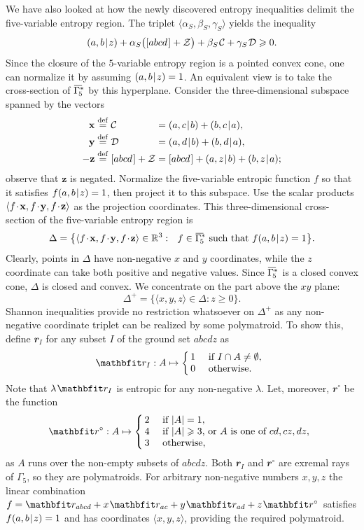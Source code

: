 \documentclass[reqno]{amsart}
\makeatletter
\theoremstyle{definition}
\renewenvironment{cases}{\left\{\mkern-6mu\begin{array}{l@{~~~}l}}{\end{array}\right.}
\newcommand\tsp{\mkern 1.5mu}
\def\|{\mkern1.5mu{|}\mkern1.5mu}
\renewcommand\ge{\geqslant}\renewcommand\le{\leqslant}
\newcommand\C{\mathcal C}
\newcommand\D{\mathcal D}
\newcommand\Z{\mathcal Z} %
\newcommand\R{\mathbb R}  %
\def\<{\langle}\def\>{\rangle}
\def\r{\mathbfit r}
\newcommand\eqdef{\stackrel{\mathrm{def}}{=}}
\def\m#1{\tsp{#1}\tsp}
\def\G#1{\Gamma_{\!#1}}
\def\barGamma{\mkern1mu\overline{\hbox{$\mkern-1mu\Gamma\mkern4mu$}}\mkern-4mu}
\def\clGa#1{\barGamma^*_{\!#1}}
\def\abcd{[abcd\tsp]}
\makeatother
\begin{document}
We have also looked at how the newly discovered entropy inequalities delimit
the five-variable entropy region. The triplet $\<\alpha_S, \beta_S,
\gamma_S\>$ yields the inequality
$$
    (a,b\|z)+ \alpha_S\big( \abcd+\Z \big) + \beta_S\tsp\C +
     \gamma_S\tsp\D \ge 0.
$$
Since the closure of the $5$-variable entropy region is a pointed convex
cone, one can normalize it by assuming $(a,b\|z)=1$. An equivalent view is
to take the cross-section of $\clGa5$ by this hyperplane. Consider the
three-dimensional subspace spanned by the vectors
$$\begin{array}{r@{\;}l@{\;}l}
  \mathbf x &\eqdef \C &= (a,c\|b)+(b,c\|a), \\[2pt]
  \mathbf y &\eqdef \D &= (a,d\|b)+(b,d\|a), \\[2pt]
 -\mathbf z &\eqdef \abcd+\Z &= \abcd + (a,z\|b) + (b,z\|a);
\end{array}$$
observe that $\mathbf z$ is negated. Normalize the five-variable entropic
function $f$ so that it satisfies $f(a,b\|z)=1$, then project it to this
subspace. Use the scalar products $\<f\m\cdot\mathbf x,f\m\cdot\mathbf
y,f\m\cdot\mathbf z\>$ as the projection coordinates. This three-dimensional
cross-section of the five-variable entropy region is
$$
  \Delta = \big\{ \<f\m\cdot\mathbf x,
                f\m\cdot\mathbf y,
                f\m\cdot\mathbf z\>\in\R^3 : ~~
                f\in\clGa5 \mbox{ such that } f(a,b\|z)=1 \big\}.
$$
Clearly, points in $\Delta$ have non-negative $x$ and $y$ coordinates,
while the $z$ coordinate can take both positive and negative values.
Since $\clGa5$ is a closed convex cone, $\Delta$ is closed and convex.
We concentrate on the part above the $xy$ plane:
$$
  \Delta^+ = \{\<x,y,z\>\in\Delta: z\ge 0\}.
$$
Shannon inequalities provide no restriction whatsoever on $\Delta^+$ as any
non-negative coordinate triplet can be realized by some polymatroid. To show
this, define $\r_I$ for any subset $I$ of the ground set $abcdz$ as
$$
   \r_I : A \mapsto \begin{cases}
          1& \mbox{ if } I\cap A\ne\emptyset,\\
          0& \mbox{ otherwise.}
          \end{cases}
$$
Note that $\lambda\tsp\r_I$ is entropic for any non-negative $\lambda$.
Let, moreover, $\r^\circ$ be the function
$$
   \r^\circ : A\mapsto  \begin{cases}
     2 & \mbox{ if } |A|=1, \\
     4 & \mbox{ if $|A|\ge3$, or $A$ is one of }cd, cz, dz,\\
     3 & \mbox{ otherwise,}
\end{cases}$$
as $A$ runs over the non-empty subsets of $abcdz$. Both $\r_I$ and
$\r^\circ$ are exremal rays of $\G5$, so they are polymatroids. For
arbitrary non-negative numbers $x,y,z$ the linear combination
$f=\r_{abcd}+x\tsp\r_{ac}+y\tsp\r_{ad}+z\tsp\r^\circ$ satisfies
$f(a,b\|z)=1$ and has coordinates $\langle x,y,z \rangle$, providing the
required polymatroid.
\end{document}
